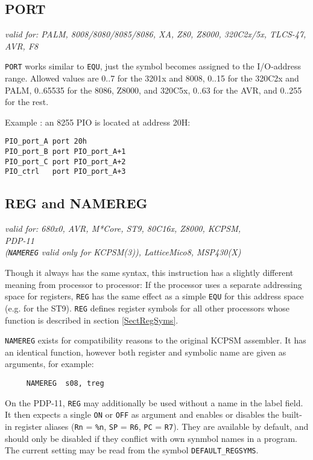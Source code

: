 \documentclass[12pt,twoside]{report}
\makeatletter
\newcommand{\tty}[1]{{\tt #1}}
\newcommand{\ttindex}[1]{\index{#1@{\tt #1}}}
\makeatother
\begin{document}

\subsection{PORT}
\ttindex{PORT}

{\em valid for: PALM, 8008/8080/8085/8086, XA, Z80, Z8000, 320C2x/5x, TLCS-47, AVR, F8}

\tty{PORT} works similar to \tty{EQU}, just the symbol becomes assigned to the
I/O-address range.  Allowed values are 0..7 for the 3201x and 8008, 0..15 for the
320C2x and PALM, 0..65535 for the 8086, Z8000, and 320C5x, 0..63 for the AVR, and 0..255
for the rest.

Example : an 8255 PIO is located at address 20H:
\begin{verbatim}
PIO_port_A port 20h
PIO_port_B port PIO_port_A+1
PIO_port_C port PIO_port_A+2
PIO_ctrl   port PIO_port_A+3
\end{verbatim}


\subsection{REG and NAMEREG}
\ttindex{REG}\ttindex{NAMEREG}

{\em valid for: 680x0, AVR, M*Core, ST9, 80C16x, Z8000, KCPSM, \\
     PDP-11 \\
     ({\tt NAMEREG} valid only for KCPSM(3)), LatticeMico8, MSP430(X)}

Though it always has the same syntax, this instruction has a slightly
different meaning from processor to processor:  If the processor uses a
separate addressing space for registers, \tty{REG} has the same effect as
a simple \tty{EQU} for this address space (e.g. for the ST9).  \tty{REG}
defines register symbols for all other processors whose function is
described in section \ref{SectRegSyms}.

{\tt NAMEREG} exists for compatibility reasons to the original KCPSM
assembler.  It has an identical function, however both register and
symbolic name are given as arguments, for example:
\begin{verbatim}
     NAMEREG  s08, treg
\end{verbatim}

On the PDP-11, \tty{REG} may additionally be used without a name in the
label field.  It then expects a single \tty{ON} or \tty{OFF} as argument
and enables or disables the built-in register aliases (\tty{Rn} = \tty{\%n},
\tty{SP} = \tty{R6}, \tty{PC} = \tty{R7}).  They are available by default,
and should only be disabled if they conflict with own synmbol names in a
program. The current setting may be read from the symbol \tty{DEFAULT\_REGSYMS}.
\end{document}
